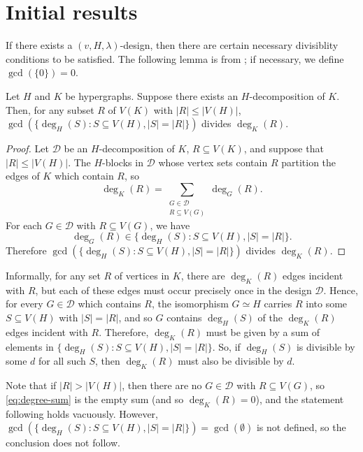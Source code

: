 \section{Initial results}

If there exists a $(v, H, \lambda)$-design, then there are certain necessary divisiblity conditions to be satisfied.
The following lemma is from \cite{bryant}; if necessary, we define $\gcd(\{0\}) = 0$.

\begin{lemma} \label{obv-necessary-1}
Let $H$ and $K$ be hypergraphs. Suppose there exists an $H$-decomposition of $K$.
Then, for any subset $R$ of $V(K)$ with $|R| \leq |V(H)|$,
$\gcd(\{\deg_H(S) : S \subseteq V(H), |S| = |R|\})$ divides $\deg_K(R)$.
\end{lemma}

\begin{proof}
Let $\mathcal{D}$ be an $H$-decomposition of $K$, $R \subseteq V(K)$, and suppose that $|R| \leq |V(H)|$.
The $H$-blocks in $\mathcal{D}$ whose vertex sets contain $R$ partition the edges of $K$ which contain $R$, so
\begin{equation} \label{eq:degree-sum}
    \deg_K(R) = \sum_{\substack{G \in \mathcal{D} \\ R \subseteq V(G)}} \deg_G(R).
\end{equation}
For each $G \in \mathcal{D}$ with $R \subseteq V(G)$, we have
\[
    \deg_G(R) \in \{\deg_H(S) : S \subseteq V(H), |S| = |R|\}.
\]
Therefore $\gcd(\{\deg_H(S) : S \subseteq V(H), |S| = |R|\})$ divides $\deg_K(R)$.
\end{proof}

Informally, for any set $R$ of vertices in $K$, there are $\deg_K(R)$ edges incident with $R$,
but each of these edges must occur precisely once in the design $\mathcal{D}$.
Hence, for every $G \in \mathcal{D}$ which contains $R$, the isomorphism $G \simeq H$
carries $R$ into some $S \subseteq V(H)$ with $|S| = |R|$, and so $G$ contains
$\deg_H(S)$ of the $\deg_K(R)$ edges incident with $R$.
Therefore, $\deg_K(R)$ must be given by a sum of elements in $\{\deg_H(S) : S \subseteq V(H), |S| = |R|\}$.
So, if $\deg_H(S)$ is divisible by some $d$ for all such $S$, then $\deg_K(R)$ must also be divisible by $d$.

Note that if $|R| > |V(H)|$, then there are no $G \in \mathcal{D}$ with $R \subseteq V(G)$,
so \eqref{eq:degree-sum} is the empty sum (and so $\deg_K(R) = 0$), and the statement following holds vacuously.
However, $\gcd(\{\deg_H(S) : S \subseteq V(H), |S| = |R|\}) = \gcd(\emptyset)$ is not defined,
so the conclusion does not follow.

